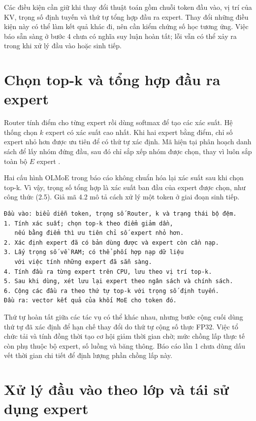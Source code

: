 Các điều kiện cần giữ khi thay đổi thuật toán gồm chuỗi token đầu vào, vị trí của KV, trọng số định tuyến và thứ tự tổng hợp đầu ra expert. Thay đổi những điều kiện này có thể làm kết quả khác đi, nên cần kiểm chứng số học tương ứng. Việc báo sẵn sàng ở bước 4 chưa có nghĩa suy luận hoàn tất; lỗi vẫn có thể xảy ra trong khi xử lý đầu vào hoặc sinh tiếp.

\section{Chọn top-k và tổng hợp đầu ra expert}

Router tính điểm cho từng expert rồi dùng softmax để tạo các xác suất. Hệ thống chọn $k$ expert có xác suất cao nhất. Khi hai expert bằng điểm, chỉ số expert nhỏ hơn được ưu tiên để có thứ tự xác định. Mã hiện tại phân hoạch danh sách để lấy nhóm đứng đầu, sau đó chỉ sắp xếp nhóm được chọn, thay vì luôn sắp toàn bộ $E$ expert \cite{moe_tierengine_arch}.

Hai cấu hình OLMoE trong báo cáo không chuẩn hóa lại xác suất sau khi chọn top-k. Vì vậy, trọng số tổng hợp là xác suất ban đầu của expert được chọn, như công thức (2.5). Giả mã 4.2 mô tả cách xử lý một token ở giai đoạn sinh tiếp.

\begin{Verbatim}[samepage=true,breaklines=true,breakanywhere=true,fontsize=\small,frame=single,framesep=3mm]
Đầu vào: biểu diễn token, trọng số Router, k và trạng thái bộ đệm.
1. Tính xác suất; chọn top-k theo điểm giảm dần,
   nếu bằng điểm thì ưu tiên chỉ số expert nhỏ hơn.
2. Xác định expert đã có bản dùng được và expert còn cần nạp.
3. Lấy trọng số về RAM; có thể phối hợp nạp dữ liệu
   với việc tính những expert đã sẵn sàng.
4. Tính đầu ra từng expert trên CPU, lưu theo vị trí top-k.
5. Sau khi dùng, xét lưu lại expert theo ngân sách và chính sách.
6. Cộng các đầu ra theo thứ tự top-k với trọng số định tuyến.
Đầu ra: vector kết quả của khối MoE cho token đó.
\end{Verbatim}

Thứ tự hoàn tất giữa các tác vụ có thể khác nhau, nhưng bước cộng cuối dùng thứ tự đã xác định để hạn chế thay đổi do thứ tự cộng số thực FP32. Việc tổ chức tải và tính đồng thời tạo cơ hội giảm thời gian chờ; mức chồng lấp thực tế còn phụ thuộc bộ expert, số luồng và băng thông. Báo cáo lần 1 chưa dùng dấu vết thời gian chi tiết để định lượng phần chồng lấp này.

\section{Xử lý đầu vào theo lớp và tái sử dụng expert}


